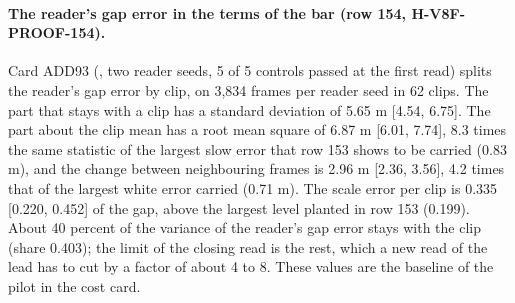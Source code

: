 \paragraph{The reader's gap error in the terms of the bar (row 154, H-V8F-PROOF-154).} Card ADD93 (, two reader seeds, 5 of 5 controls passed at the first read) splits the reader's gap error by clip, on 3,834 frames per reader seed in 62 clips. The part that stays with a clip has a standard deviation of 5.65 m [4.54, 6.75]. The part about the clip mean has a root mean square of 6.87 m [6.01, 7.74], 8.3 times the same statistic of the largest slow error that row 153 shows to be carried (0.83 m), and the change between neighbouring frames is 2.96 m [2.36, 3.56], 4.2 times that of the largest white error carried (0.71 m). The scale error per clip is 0.335 [0.220, 0.452] of the gap, above the largest level planted in row 153 (0.199). About 40 percent of the variance of the reader's gap error stays with the clip (share 0.403); the limit of the closing read is the rest, which a new read of the lead has to cut by a factor of about 4 to 8. These values are the baseline of the pilot in the cost card.

